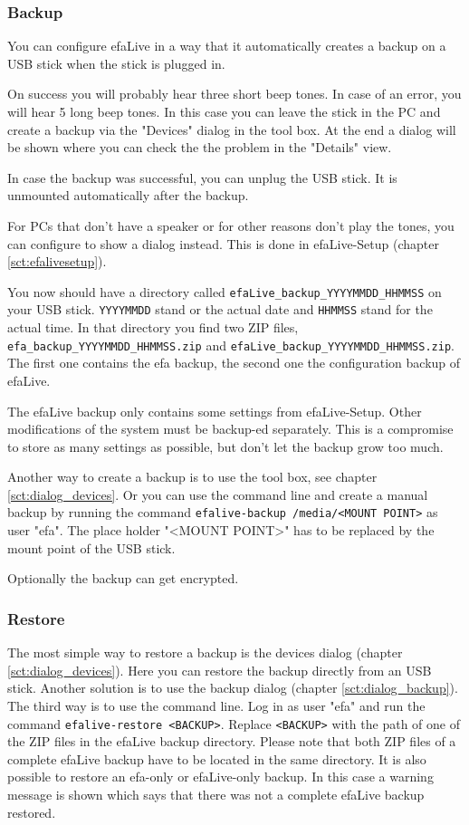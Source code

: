 \documentclass[a4paper,12pt,twoside]{article}
\begin{document}
\subsubsection{Backup}
\label{sct:backup}
You can configure efaLive in a way
that it automatically creates a backup on a USB stick when the stick is
plugged in.

On success you will probably hear three short beep tones. In case of an
error, you will hear 5 long beep tones. In this case you can leave the
stick in the PC and create a backup via the "Devices" dialog in the tool 
box. At the end a dialog will be shown where you can check the the problem
in the "Details" view.

In case the backup was successful, you can unplug the USB stick. It is
unmounted automatically after the backup.

For PCs that don't have a speaker or for other reasons
don't play the tones, you can configure to show a
dialog instead. This is done in efaLive-Setup (chapter \ref{sct:efalivesetup}).

You now should have a directory called
\texttt{efaLive\_backup\_YYYYMMDD\_HHMMSS} on your
USB stick. \texttt{YYYYMMDD} stand or the actual
date and \texttt{HHMMSS} stand for the actual
time. In that directory you find two ZIP files,
\texttt{efa\_backup\_YYYYMMDD\_HHMMSS.zip} and
\texttt{efaLive\_backup\_YYYYMMDD\_HHMMSS.zip}.
The first one contains the efa backup, the second one the configuration
backup of efaLive.

The efaLive backup only contains some settings from efaLive-Setup. Other
modifications of the system must be backup-ed separately. This is a
compromise to store as many settings as possible, but
don't let the backup grow too much.

Another way to create a backup is to use the tool box, see chapter 
\ref{sct:dialog_devices}. Or you can use the command line and create a manual 
backup by running the command \texttt{efalive-backup 
/media/{\textless}MOUNT POINT{\textgreater}} as user "efa". The place 
holder "{\textless}MOUNT POINT{\textgreater}" has to be replaced by the 
mount point of the USB stick.

Optionally the backup can get encrypted.


\subsubsection{Restore}
\label{sct:restore}
The most simple way to restore a backup is the devices dialog (chapter
\ref{sct:dialog_devices}). Here you can restore the backup directly from an USB stick.
Another solution is to use the backup dialog (chapter \ref{sct:dialog_backup}). The third
way is to use the command line. Log in as user
"efa" and run the command
\texttt{efalive-restore {\textless}BACKUP{\textgreater}}. Replace
\texttt{{\textless}BACKUP{\textgreater}} with the
path of one of the ZIP files in the efaLive backup directory. Please
note that both ZIP files of a complete efaLive backup have to be located in the
same directory. It is also possible to restore an efa-only or efaLive-only backup.
In this case a warning message is shown which says that there was not a complete
efaLive backup restored.
\end{document}
